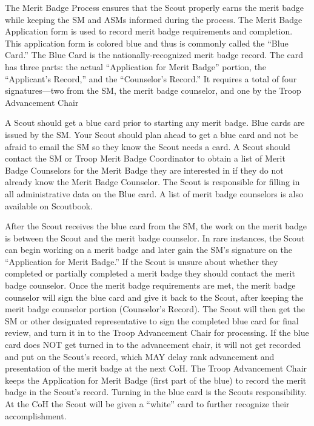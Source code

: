\documentclass{ltxguide}
\begin{document}
The Merit Badge Process ensures that the Scout properly earns the merit badge while keeping the \ac{SM} and \acp{ASM} informed during the process. The Merit Badge Application form is used to record merit badge requirements and completion. This application form is colored blue and thus is commonly called the “Blue Card.” The Blue Card is the nationally-recognized merit badge record. The card has three parts: the actual “Application for
Merit Badge” portion, the “Applicant's Record,” and the “Counselor's Record.” It requires a total of four signatures—two from the \ac{SM}, the merit badge counselor, and one by the Troop Advancement Chair

A Scout should get a blue card prior to starting any merit badge. Blue cards are issued by the \ac{SM}. Your Scout should plan ahead to get a blue card and not be afraid to email the \ac{SM} so they know the Scout needs a card. A Scout should contact the \ac{SM} or Troop Merit Badge Coordinator to obtain a list of Merit Badge Counselors for the Merit Badge they are interested in if they do not already know the Merit Badge Counselor. The Scout is responsible for filling in all administrative data on the Blue card. A list of merit badge counselors is also available on Scoutbook.

After the Scout receives the blue card from the SM, the work on the merit badge is between the Scout and the merit badge counselor. In rare instances, the Scout can begin working on a merit badge and later gain the SM's signature on the “Application for Merit Badge.” If the Scout is unsure about whether they completed or partially completed a merit badge they should contact the merit badge counselor. Once the merit badge requirements are met, the merit badge counselor will sign the blue card and give it back to the Scout, after keeping the merit badge counselor portion (Counselor's Record). The Scout will then get the \ac{SM} or other designated representative to sign the completed blue card for final review, and turn it in to the Troop Advancement Chair for processing. If the blue card does NOT get turned in to the advancement chair, it will not get recorded and put on the Scout's record, which MAY delay rank advancement and presentation of the merit badge at the next \ac{CoH}. The Troop Advancement Chair keeps the Application for Merit Badge (first part of the blue) to record the merit badge in the Scout's record. Turning in the blue card is the Scouts responsibility. At the \ac{CoH} the Scout will be given a “white” card to further recognize their accomplishment.
\end{document}
